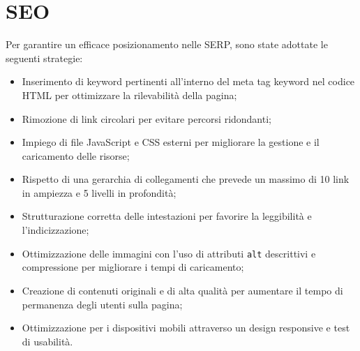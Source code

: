 \section{SEO}
Per garantire un efficace posizionamento nelle SERP, sono state adottate le seguenti strategie:
\begin{itemize}
\item Inserimento di keyword pertinenti all'interno del meta tag keyword nel codice HTML per ottimizzare la rilevabilità della pagina;
\item Rimozione di link circolari per evitare percorsi ridondanti;
\item Impiego di file JavaScript e CSS esterni per migliorare la gestione e il caricamento delle risorse;
\item Rispetto di una gerarchia di collegamenti che prevede un massimo di 10 link in ampiezza e 5 livelli in profondità;
\item Strutturazione corretta delle intestazioni per favorire la leggibilità e l’indicizzazione;
\item Ottimizzazione delle immagini con l’uso di attributi \texttt{alt} descrittivi e compressione per migliorare i tempi di caricamento;
\item Creazione di contenuti originali e di alta qualità per aumentare il tempo di permanenza degli utenti sulla pagina;
\item Ottimizzazione per i dispositivi mobili attraverso un design responsive e test di usabilità.
\end{itemize}